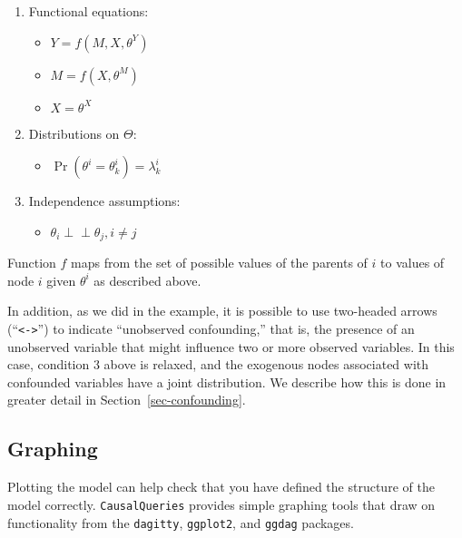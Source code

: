\documentclass[
  11pt,
  article]{jss}
\providecommand{\tightlist}{%
  \setlength{\itemsep}{0pt}\setlength{\parskip}{0pt}}\usepackage{longtable,booktabs,array}
\begin{document}
\begin{enumerate}
\def\labelenumi{\arabic{enumi}.}
\item
  Functional equations:

  \begin{itemize}
  \tightlist
  \item
    \(Y = f(M, X, \theta^Y)\)
  \item
    \(M = f(X, \theta^M)\)
  \item
    \(X = \theta^X\)
  \end{itemize}
\item
  Distributions on \(\Theta\):

  \begin{itemize}
  \tightlist
  \item
    \(\Pr(\theta^i = \theta^i_k) = \lambda^i_k\)
  \end{itemize}
\item
  Independence assumptions:

  \begin{itemize}
  \tightlist
  \item
    \(\theta_i \perp\!\!\! \perp \theta_j, i\neq j\)
  \end{itemize}
\end{enumerate}

Function \(f\) maps from the set of possible values of the parents of
\(i\) to values of node \(i\) given \(\theta^i\) as described above.

In addition, as we did in the \citet{chickering_clinicians_1996}
example, it is possible to use two-headed arrows
(``\texttt{\textless{}-\textgreater{}}'') to indicate ``unobserved
confounding,'' that is, the presence of an unobserved variable that
might influence two or more observed variables. In this case, condition
3 above is relaxed, and the exogenous nodes associated with confounded
variables have a joint distribution. We describe how this is done in
greater detail in Section~\ref{sec-confounding}.

\hypertarget{graphing}{%
\subsection{Graphing}\label{graphing}}

Plotting the model can help check that you have defined the structure of
the model correctly. \texttt{CausalQueries} provides simple graphing
tools that draw on functionality from the \texttt{dagitty},
\texttt{ggplot2}, and \texttt{ggdag} packages.
\end{document}
